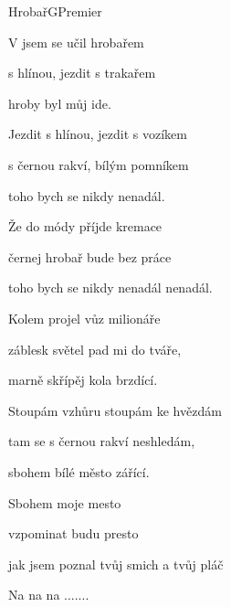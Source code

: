 \begin{song}{Hrobař}{G}{Premier}

\begin{SBVerse}

V  jsem se učil hrobařem

 s hlínou, jezdit s trakařem

 hroby byl můj ide.

\end{SBVerse}

\begin{SBVerse}

Jezdit s hlínou, jezdit s vozíkem

s černou rakví, bílým pomníkem

toho bych se nikdy nenadál.

\end{SBVerse}

\begin{SBVerse}

Že do módy příjde kremace

černej hrobař bude bez práce

toho bych se nikdy nenadál nenadál.

\end{SBVerse}

\begin{SBVerse}

Kolem projel vůz milionáře

záblesk světel pad mi do tváře,

marně skřípěj kola brzdící.

\end{SBVerse}

\begin{SBVerse}

Stoupám vzhůru stoupám ke hvězdám

tam se s černou rakví neshledám,

sbohem bílé město zářící.



Sbohem moje mesto

vzpominat budu presto

jak jsem poznal tvůj smich a tvůj pláč 

\end{SBVerse}

\begin{SBVerse}

Na na na .......

\end{SBVerse}

\end{song}

\pagebreak
